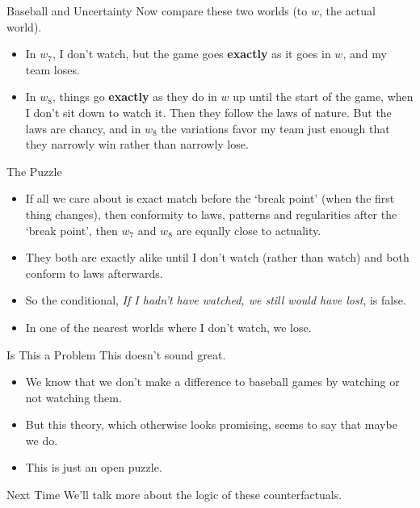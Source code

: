 \documentclass[
  ignorenonframetext,
]{beamer}
\providecommand{\tightlist}{%
  \setlength{\itemsep}{0pt}\setlength{\parskip}{0pt}}
\renewcommand{\,}{\text{, }}
\begin{document}
\begin{frame}{Baseball and Uncertainty}
\protect\hypertarget{baseball-and-uncertainty}{}
Now compare these two worlds (to \(w\), the actual world).

\begin{itemize}
\tightlist
\item
  In \(w_7\), I don't watch, but the game goes \textbf{exactly} as it
  goes in \(w\), and my team loses.
\item
  In \(w_8\), things go \textbf{exactly} as they do in \(w\) up until
  the start of the game, when I don't sit down to watch it. Then they
  follow the laws of nature. But the laws are chancy, and in \(w_8\) the
  variations favor my team just enough that they narrowly win rather
  than narrowly lose. \pause 
\end{itemize}
\end{frame}

\begin{frame}{The Puzzle}
\protect\hypertarget{the-puzzle}{}
\begin{itemize}
\tightlist
\item
  If all we care about is exact match before the `break point' (when the
  first thing changes), then conformity to laws, patterns and
  regularities after the `break point', then \(w_7\) and \(w_8\) are
  equally close to actuality.
\item
  They both are exactly alike until I don't watch (rather than watch)
  and both conform to laws afterwards.
\item
  So the conditional, \emph{If I hadn't have watched, we still would
  have lost}, is false.
\item
  In one of the nearest worlds where I don't watch, we lose.
\end{itemize}
\end{frame}

\begin{frame}{Is This a Problem}
\protect\hypertarget{is-this-a-problem}{}
This doesn't sound great.

\begin{itemize}
\tightlist
\item
  We know that we don't make a difference to baseball games by watching
  or not watching them.
\item
  But this theory, which otherwise looks promising, seems to say that
  maybe we do.
\item
  This is just an open puzzle.
\end{itemize}
\end{frame}

\begin{frame}{Next Time}
\protect\hypertarget{next-time}{}
We'll talk more about the logic of these counterfactuals.
\end{frame}
\end{document}
